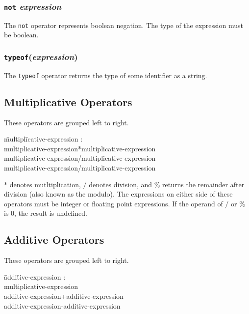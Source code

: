 \documentclass{article}
\begin{document}
\subsubsection{\texttt{not} \emph{expression}}
The \texttt{not} operator represents boolean negation. The type of the expression must be boolean.

\subsubsection{\texttt{typeof}(\emph{expression})}
The \texttt{typeof} operator returns the type of some identifier as a string.

\subsection{Multiplicative Operators}
These operators are grouped left to right.
\begin{itshape}
\begin{tabbing}
	\= multipl\=icative-expression : \\
		\>\> multiplicative-expression*multiplicative-expression \\		
		\>\> multiplicative-expression/multiplicative-expression \\
		\>\> multiplicative-expression/multiplicative-expression
\end{tabbing}
\end{itshape}

$*$ denotes mutltiplication, $/$ denotes division, and $\%$ returns the remainder after division (also known as the modulo). The expressions on either side of these operators must be integer or floating point expressions. If the operand of $/$ or $\%$ is 0, the result is undefined.

\subsection{Additive Operators}
These operators are grouped left to right.
\begin{itshape}
\begin{tabbing}
	\= addi\=tive-expression : \\
		\> \> multiplicative-expression \\
		\>\> additive-expression+additive-expression \\		
		\>\> additive-expression-additive-expression
\end{tabbing}
\end{itshape}
\end{document}
